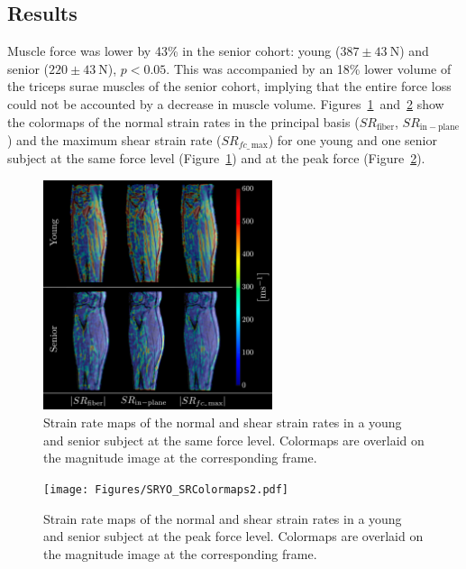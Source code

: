 \subsection{Results}
Muscle force was lower by 43\% in the senior cohort: young ($387 \pm \SI{43}{\newton}$) and senior ($220 \pm \SI{43}{\newton}$), $p < 0.05$.
This was accompanied by an 18\% lower volume of the triceps surae muscles of the senior cohort, implying that the entire force loss could not be accounted by a decrease in muscle volume. 
Figures~\ref{fig: SR2_2}~and~\ref{fig: SR2_3} show the colormaps of the normal strain rates in the principal basis ($SR_{\mathrm{fiber}}$, $SR_{\mathrm{in-plane}}$) and the maximum shear strain rate ($SR_{fc\_\,\mathrm{max}}$) for one young and one senior subject at the same force level (Figure~\ref{fig: SR2_2}) and at the peak force (Figure~\ref{fig: SR2_3}). 
\begin{figure}[!htb]
\vspace{+0.2cm}
\centering
\includegraphics[width=0.6\textwidth]{Figures/SRYO_SRColormaps1.pdf}
\caption[Strain rate maps of the normal and shear strain rates in a young and senior subject at the same force level]{Strain rate maps of the normal and shear strain rates in a young and senior subject at the same force level. Colormaps are overlaid on the magnitude image at the corresponding frame.}
\label{fig: SR2_2}
\end{figure}
\begin{figure}[!htb]
\vspace{+0.2cm}
\centering
\texttt{[image: Figures/SRYO\_SRColormaps2.pdf]}
\caption[Strain rate maps of the normal and shear strain rates in a young and senior subject at the peak force level]{Strain rate maps of the normal and shear strain rates in a young and senior subject at the peak force level. Colormaps are overlaid on the magnitude image at the corresponding frame.}
\label{fig: SR2_3}
\end{figure}

